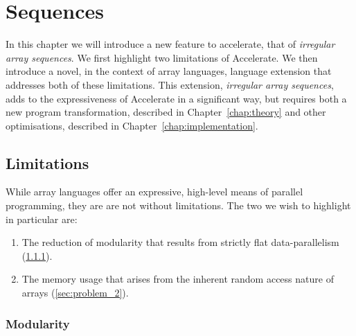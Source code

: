 \chapter{Sequences}
\label{chap:motivation}

In this chapter we will introduce a new feature to accelerate, that of \emph{irregular array sequences}. We first highlight two limitations of Accelerate. We then introduce a novel, in the context of array languages, language extension that addresses both of these limitations. This extension, \emph{irregular array sequences}, adds to the expressiveness of Accelerate in a significant way, but requires both a new program transformation, described in Chapter~\ref{chap:theory} and other optimisations, described in Chapter~\ref{chap:implementation}.



\section{Limitations}
\label{sec:limitations}
While array languages offer an expressive, high-level means of parallel programming, they are are not without limitations. The two we wish to highlight in particular are:
%
\begin{enumerate}
\item The reduction of modularity that results from strictly flat data-parallelism (\ref{sec:problem_1}).
\item The memory usage that arises from the inherent random access nature of arrays (\ref{sec:problem_2}).
\end{enumerate}
%

\subsection{Modularity}
\label{sec:problem_1}

